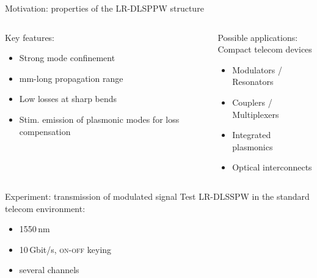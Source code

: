   \begin{frame}{Motivation: properties of the LR-DLSPPW structure}
    \begin{columns}
        \begin{block}{Key features:}
          \begin{itemize}
            \item Strong mode confinement%
            \item mm-long propagation range
            \item Low losses at sharp bends
            \item Stim. emission of plasmonic modes for loss compensation
          \end{itemize}
        \end{block}
        \begin{block}{Possible applications:\\
                      Compact telecom devices}
          \begin{itemize}
            \item Modulators / Resonators
            \item Couplers / Multiplexers
            \item Integrated plasmonics
            \item Optical interconnects
          \end{itemize}
        \end{block}
    \end{columns}
    \pause
    \begin{center}
      \begin{minipage}{0.8\textwidth}
        \begin{alertblock}{Experiment: transmission of modulated signal}
          Test LR-DLSSPW in the standard telecom environment:
          \begin{itemize}
            \item 1550\,nm
            \item 10\,Gbit/s, \textsc{on-off} keying
            \item several channels
          \end{itemize}
        \end{alertblock}
      \end{minipage}
    \end{center}
  \end{frame}






